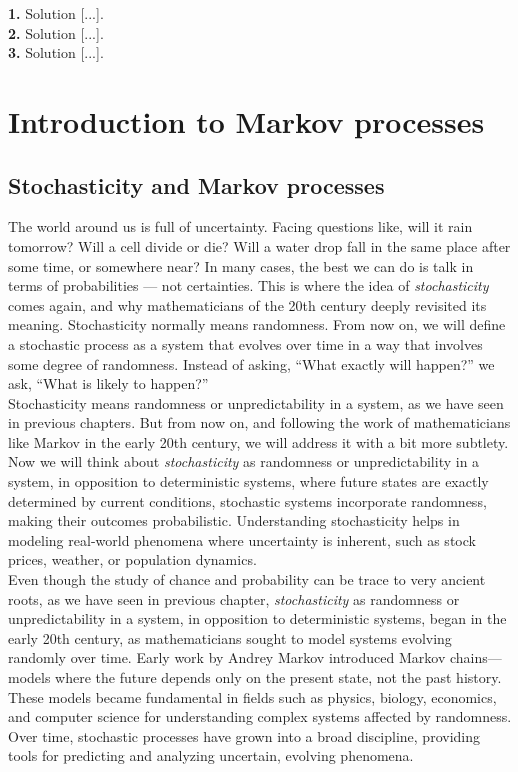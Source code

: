 \documentclass{book}
\begin{document}
\textbf{1.} Solution [...].\\

\textbf{2.} Solution [...].\\

\textbf{3.} Solution [...].\\



\chapter{Introduction to Markov processes}

\section{Stochasticity and Markov processes}

The world around us is full of uncertainty. Facing questions like, will it rain tomorrow? Will a cell divide or die? Will a water drop fall in the same place after some time, or somewhere near? In many cases, the best we can do is talk in terms of probabilities — not certainties. This is where the idea of \textit{stochasticity} comes again, and why mathematicians of the 20th century deeply revisited its meaning. Stochasticity normally means randomness. From now on, we will define a stochastic process as a system that evolves over time in a way that involves some degree of randomness. Instead of asking, “What exactly will happen?” we ask, “What is likely to happen?”\\

Stochasticity means randomness or unpredictability in a system, as we have seen in previous chapters. But from now on, and following the work of mathematicians like Markov in the early 20th century, we will address it with a bit more subtlety. Now we will think about \textit{stochasticity} as randomness or unpredictability in a system, in opposition to deterministic systems, where future states are exactly determined by current conditions, stochastic systems incorporate randomness, making their outcomes probabilistic. Understanding stochasticity helps in modeling real-world phenomena where uncertainty is inherent, such as stock prices, weather, or population dynamics.\\

Even though the study of chance and probability can be trace to very ancient roots, as we have seen in previous chapter, \textit{stochasticity} as randomness or unpredictability in a system, in opposition to deterministic systems, began in the early 20th century, as mathematicians sought to model systems evolving randomly over time. Early work by Andrey Markov introduced Markov chains—models where the future depends only on the present state, not the past history. These models became fundamental in fields such as physics, biology, economics, and computer science for understanding complex systems affected by randomness. Over time, stochastic processes have grown into a broad discipline, providing tools for predicting and analyzing uncertain, evolving phenomena.\\
\end{document}
